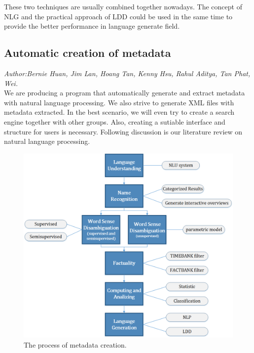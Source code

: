 These two techniques are usually combined together nowadays. 
The concept of NLG and the practical approach of LDD could be used in the same time to provide the better performance in language generate field.



\subsection{Automatic creation of metadata}
\textit{\footnotesize Author:Bernie Huan, Jim Lan, Hoang Tan, Kenny Hsu, Rahul Aditya, Tan Phat, Wei.}\\

We are producing a program that automatically generate and extract metadata with natural language processing. 
We also strive to generate XML files with metadata extracted. 
In the best scenario, we will even try to create a search engine together with other groups. 
Also, creating a sutiable interface and structure for users is necessary.  
Following discussion is our literature review on natural language processing.

\begin{figure}[ht]
	\begin{center}
		\includegraphics[width=1.8\columnwidth]{Union_Background_Chart_1}
	\end{center}
	\caption{The process of metadata creation.}
\end{figure}

